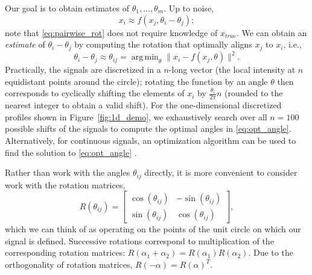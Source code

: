 \documentclass{pnastwo}
\DeclareMathOperator*{\argmin}{arg\,min}
\begin{document}
\begin{article}
\begin{materials}
Our goal is to obtain estimates of $\theta_1, \dots, \theta_m$.
%
Up to noise,
\begin{equation} \label{eq:pairwise_rot}
x_i \approx f(x_j, \theta_i - \theta_j) ;
\end{equation}
note that \eqref{eq:pairwise_rot} does not require knowledge of $x_{true}$.
%
We can obtain an {\em estimate} of $\theta_i - \theta_j$ by computing the rotation that optimally aligns $x_j$ to $x_i$,
i.e., %
%
\begin{equation} \label{eq:opt_angle}
\theta_i - \theta_j \approx \theta_{ij} = \argmin_{\theta} \|x_i - f(x_j, \theta)\|^2.
\end{equation}
%
Practically, the signals are discretized in a $n$-long vector (the local intensity at $n$ equidistant points around the circle);
rotating the function by an angle $\theta$ then corresponds to cyclically shifting the elements of $x_i$
by $\frac{\theta_i}{2 \pi} n$ (rounded to the nearest integer to obtain a valid shift).
%
For the one-dimensional discretized profiles shown in Figure~\ref{fig:1d_demo}, we exhaustively search over all $n=100$ possible shifts of the signals to compute the optimal angles in \eqref{eq:opt_angle}.
%
Alternatively, for continuous signals, an optimization algorithm
can be used to find the solution to \eqref{eq:opt_angle} \cite{ahuja2007template}.

Rather than work with the angles $\theta_{ij}$ directly, it is more convenient to consider work with the rotation matrices,
\begin{equation} \label{eq:R_theta}
R(\theta_{ij}) = \begin{bmatrix}
\cos(\theta_{ij}) & -\sin(\theta_{ij}) \\
\sin(\theta_{ij}) & \cos(\theta_{ij})
\end{bmatrix},
\end{equation}
which we can think of as operating on the points of the unit circle on which our signal is defined.
%
Successive rotations correspond to multiplication of the corresponding rotation matrices: $R(\alpha_1 + \alpha_2) = R(\alpha_1) R(\alpha_2)$.
%
Due to the orthogonality of rotation matrices, $R(-\alpha) = R(\alpha)^T$.


\end{materials}
\end{article}
\end{document}

